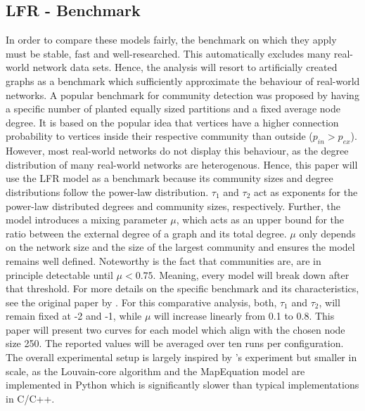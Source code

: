 \documentclass[11pt, twocolumn]{article}
\begin{document}
\subsection{LFR - Benchmark}
In order to compare these models fairly, the benchmark on which they apply must be stable, fast and well-researched. This automatically excludes many real-world network data sets. Hence, the analysis will resort to artificially created graphs as a benchmark which sufficiently approximate the behaviour of real-world networks. A popular benchmark for community detection was proposed by \citeauthor{girvan_CommunityStructureSocial_2002} having a specific number of planted equally sized partitions and a fixed average node degree. It is based on the popular idea that vertices have a higher connection probability to vertices inside their respective community than outside ($p_{in} > p_{ex}$). However, most real-world networks do not display this behaviour, as the degree distribution of many real-world networks are heterogenous.\cite{lancichinetti_CommunityDetectionAlgorithms_2009} Hence, this paper will use the LFR model as a benchmark because its community sizes and degree distributions follow the power-law distribution. $\tau_1$ and $\tau_2$ act as exponents for the power-law distributed degrees and community sizes, respectively. Further, the model introduces a mixing parameter $\mu$, which acts as an upper bound for the ratio between the external degree of a graph and its total degree. $\mu$ only depends on the network size and the size of the largest community and ensures the model remains well defined. Noteworthy is the fact that communities are, are in principle detectable until $\mu<0.75$. Meaning, every model will break down after that threshold. For more details on the specific benchmark and its characteristics, see the original paper by \citeauthor{lancichinetti_CommunityDetectionAlgorithms_2009}. For this comparative analysis, both, $\tau_1$ and $\tau_2$, will remain fixed at -2 and -1, while $\mu$ will increase linearly from 0.1 to 0.8. This paper will present two curves for each model which align with the chosen node size 250. The reported values will be averaged over ten runs per configuration. The overall experimental setup is largely inspired by \citeauthor{lancichinetti_CommunityDetectionAlgorithms_2009} 's experiment but smaller in scale, as the Louvain-core algorithm and the MapEquation model are implemented in Python which is significantly slower than typical implementations in C/C++.      
\end{document}
